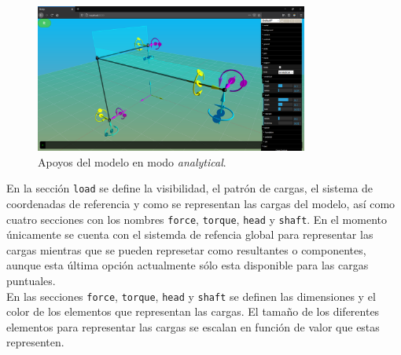 \begin{figure}[ht]
  \centering
  \includegraphics[width=0.8\textwidth]{introduction/dat-gui-support.png}
  \caption{Apoyos del modelo en modo \emph{analytical}.}
  \label{fig:dat.gui-support}
\end{figure}

En la sección \verb|load| se define la visibilidad, el patrón de cargas, el sistema de coordenadas de referencia y como se representan las cargas del modelo, así como cuatro secciones con los nombres \verb|force|, \verb|torque|, \verb|head| y \verb|shaft|. En el momento únicamente se cuenta con el sistemda de refencia global para representar las cargas mientras que se pueden represetar como resultantes o componentes, aunque esta última opción actualmente sólo esta disponible para las cargas puntuales.\\

En las secciones \verb|force|, \verb|torque|, \verb|head| y \verb|shaft| se definen las dimensiones y el color de los elementos que representan las cargas. El tamaño de los diferentes elementos para representar las cargas se escalan en función de valor que estas representen.\\
